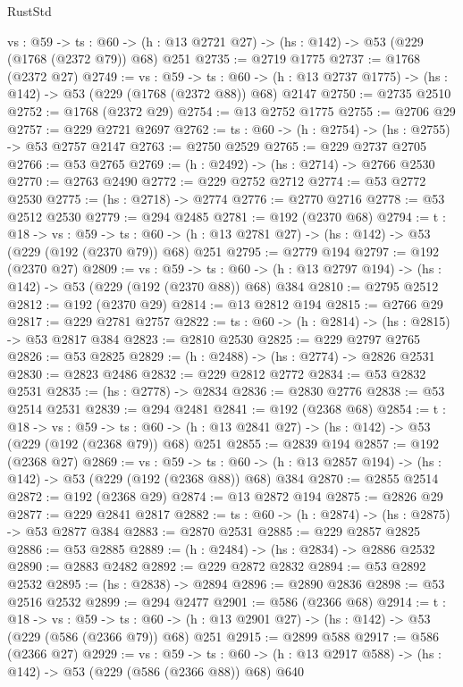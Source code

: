 \begin{lexlean}{RustStd}
\begin{coremodule}
  {vs : @59} ->
  {ts : @60} -> (h : @13 @2721 @27) -> (hs : @142) -> @53 (@229 (@1768 (@2372 @79)) @68) @251
@2735 := @2719 @1775
@2737 := @1768 (@2372 @27)
@2749 := {vs : @59} ->
  {ts : @60} -> (h : @13 @2737 @1775) -> (hs : @142) -> @53 (@229 (@1768 (@2372 @88)) @68) @2147
@2750 := @2735 @2510
@2752 := @1768 (@2372 @29)
@2754 := @13 @2752 @1775
@2755 := @2706 @29
@2757 := @229 @2721 @2697
@2762 := {ts : @60} -> (h : @2754) -> (hs : @2755) -> @53 @2757 @2147
@2763 := @2750 @2529
@2765 := @229 @2737 @2705
@2766 := @53 @2765
@2769 := (h : @2492) -> (hs : @2714) -> @2766 @2530
@2770 := @2763 @2490
@2772 := @229 @2752 @2712
@2774 := @53 @2772 @2530
@2775 := (hs : @2718) -> @2774
@2776 := @2770 @2716
@2778 := @53 @2512 @2530
@2779 := @294 @2485
@2781 := @192 (@2370 @68)
@2794 := {t : @18} ->
  {vs : @59} ->
  {ts : @60} -> (h : @13 @2781 @27) -> (hs : @142) -> @53 (@229 (@192 (@2370 @79)) @68) @251
@2795 := @2779 @194
@2797 := @192 (@2370 @27)
@2809 := {vs : @59} ->
  {ts : @60} -> (h : @13 @2797 @194) -> (hs : @142) -> @53 (@229 (@192 (@2370 @88)) @68) @384
@2810 := @2795 @2512
@2812 := @192 (@2370 @29)
@2814 := @13 @2812 @194
@2815 := @2766 @29
@2817 := @229 @2781 @2757
@2822 := {ts : @60} -> (h : @2814) -> (hs : @2815) -> @53 @2817 @384
@2823 := @2810 @2530
@2825 := @229 @2797 @2765
@2826 := @53 @2825
@2829 := (h : @2488) -> (hs : @2774) -> @2826 @2531
@2830 := @2823 @2486
@2832 := @229 @2812 @2772
@2834 := @53 @2832 @2531
@2835 := (hs : @2778) -> @2834
@2836 := @2830 @2776
@2838 := @53 @2514 @2531
@2839 := @294 @2481
@2841 := @192 (@2368 @68)
@2854 := {t : @18} ->
  {vs : @59} ->
  {ts : @60} -> (h : @13 @2841 @27) -> (hs : @142) -> @53 (@229 (@192 (@2368 @79)) @68) @251
@2855 := @2839 @194
@2857 := @192 (@2368 @27)
@2869 := {vs : @59} ->
  {ts : @60} -> (h : @13 @2857 @194) -> (hs : @142) -> @53 (@229 (@192 (@2368 @88)) @68) @384
@2870 := @2855 @2514
@2872 := @192 (@2368 @29)
@2874 := @13 @2872 @194
@2875 := @2826 @29
@2877 := @229 @2841 @2817
@2882 := {ts : @60} -> (h : @2874) -> (hs : @2875) -> @53 @2877 @384
@2883 := @2870 @2531
@2885 := @229 @2857 @2825
@2886 := @53 @2885
@2889 := (h : @2484) -> (hs : @2834) -> @2886 @2532
@2890 := @2883 @2482
@2892 := @229 @2872 @2832
@2894 := @53 @2892 @2532
@2895 := (hs : @2838) -> @2894
@2896 := @2890 @2836
@2898 := @53 @2516 @2532
@2899 := @294 @2477
@2901 := @586 (@2366 @68)
@2914 := {t : @18} ->
  {vs : @59} ->
  {ts : @60} -> (h : @13 @2901 @27) -> (hs : @142) -> @53 (@229 (@586 (@2366 @79)) @68) @251
@2915 := @2899 @588
@2917 := @586 (@2366 @27)
@2929 := {vs : @59} ->
  {ts : @60} -> (h : @13 @2917 @588) -> (hs : @142) -> @53 (@229 (@586 (@2366 @88)) @68) @640

\end{coremodule}
\end{lexlean}
